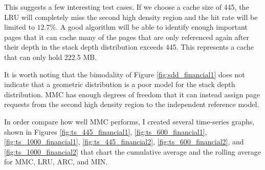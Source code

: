   This suggests a few interesting test cases. If we choose a cache size of
  445, the LRU will completely miss the second high density region and the hit
  rate will be limited to $12.7\%$. A good algorithm will be able to identify
  enough important pages that it can cache many of the pages that are only
  referenced again after their depth in the stack depth distribution exceeds
  445. This represents a cache that can only hold 222.5 MB.

  It is worth noting that the bimodality of Figure \ref{fig:sdd_financial1} does
  not indicate that a geometric distribution is a poor model for the stack depth
  distribution. MMC has enough degrees of freedom that it can instead assign
  page requests from the second high density region to the independent reference
  model.

  In order compare how well MMC performs, I created several time-series graphs,
  shown in Figures \ref{fig:ts_445_financial1}, \ref{fig:ts_600_financial1},
  \ref{fig:ts_1000_financial1}, \ref{fig:ts_445_financial2},
  \ref{fig:ts_600_financial2}, and
  \ref{fig:ts_1000_financial2} that chart the cumulative average
  and the rolling average for MMC, LRU, ARC, and MIN.


